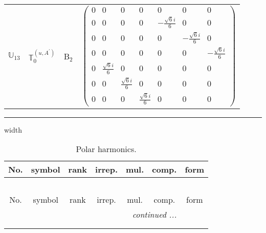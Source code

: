 \documentclass[fleqn,10pt,landscape]{article}
\begin{document}
\begin{itemize}
\begin{center}
\begin{longtable}{c|c|c|c}
$ \mathbb{U}_{13} $ & $\mathbb{T}_{0}^{(u,A^{\prime})}$ & B$_{2}$ & $\begin{pmatrix} 0 & 0 & 0 & 0 & 0 & 0 & 0 \\ 0 & 0 & 0 & 0 & - \frac{\sqrt{6} i}{6} & 0 & 0 \\ 0 & 0 & 0 & 0 & 0 & - \frac{\sqrt{6} i}{6} & 0 \\ 0 & 0 & 0 & 0 & 0 & 0 & - \frac{\sqrt{6} i}{6} \\ 0 & \frac{\sqrt{6} i}{6} & 0 & 0 & 0 & 0 & 0 \\ 0 & 0 & \frac{\sqrt{6} i}{6} & 0 & 0 & 0 & 0 \\ 0 & 0 & 0 & \frac{\sqrt{6} i}{6} & 0 & 0 & 0 \end{pmatrix}$ \\
\end{longtable}
\end{center}

 \hfil \hrule height 1mm width \textwidth \hfil

\begin{center}
\renewcommand{\arraystretch}{1.3}
\begin{longtable}{ccccccc}
\caption{Polar harmonics.}
 \\
 \hline \hline
No. & symbol & rank & irrep. & mul. & comp. & form \\ \hline \endfirsthead

\multicolumn{6}{l}{\tablename\ \thetable{}} \\
 \hline \hline
No. & symbol & rank & irrep. & mul. & comp. & form \\ \hline \endhead

 \hline \hline
\multicolumn{6}{r}{\footnotesize\it continued ...} \\ \endfoot

 \hline \hline
\multicolumn{6}{r}{} \\ \endlastfoot


\end{longtable}
\end{center}
\end{itemize}
\end{document}
